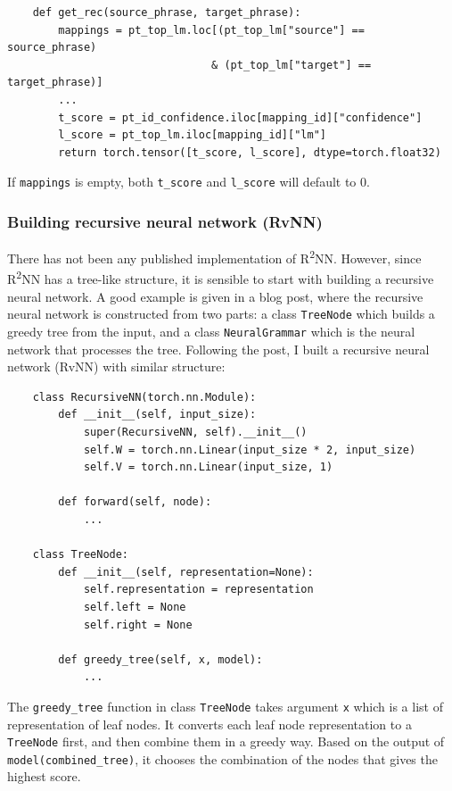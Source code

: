 \documentclass[12pt,a4paper,twoside,openright]{report}
\begin{document}
\begin{verbatim}
    def get_rec(source_phrase, target_phrase):
        mappings = pt_top_lm.loc[(pt_top_lm["source"] == source_phrase) 
                                & (pt_top_lm["target"] == target_phrase)]
        ...
        t_score = pt_id_confidence.iloc[mapping_id]["confidence"]
        l_score = pt_top_lm.iloc[mapping_id]["lm"]
        return torch.tensor([t_score, l_score], dtype=torch.float32)
\end{verbatim}

If \texttt{mappings} is empty, both \texttt{t\_score} and \texttt{l\_score} will default to 0.

\subsubsection{Building recursive neural network (RvNN)}
There has not been any published implementation of R\textsuperscript{2}NN. However, since R\textsuperscript{2}NN has a tree-like structure, it is sensible to start with building a recursive neural network. A good example is given in a blog post\cite{rvnn_daniel}, where the recursive neural network is constructed from two parts: a class \texttt{TreeNode} which builds a greedy tree from the input, and a class \texttt{NeuralGrammar} which is the neural network that processes the tree. Following the post, I built a recursive neural network (RvNN) with similar structure:

\begin{verbatim}
    class RecursiveNN(torch.nn.Module):
        def __init__(self, input_size):
            super(RecursiveNN, self).__init__()
            self.W = torch.nn.Linear(input_size * 2, input_size)
            self.V = torch.nn.Linear(input_size, 1)
    
        def forward(self, node):
            ...
    
    class TreeNode:
        def __init__(self, representation=None):
            self.representation = representation
            self.left = None
            self.right = None
    
        def greedy_tree(self, x, model):
            ...
\end{verbatim}

The \texttt{greedy\_tree} function in class \texttt{TreeNode} takes argument \texttt{x} which is a list of representation of leaf nodes. It converts each leaf node representation to a \texttt{TreeNode} first, and then combine them in a greedy way. Based on the output of \texttt{model(combined\_tree)}, it chooses the combination of the nodes that gives the highest score.
\end{document}
